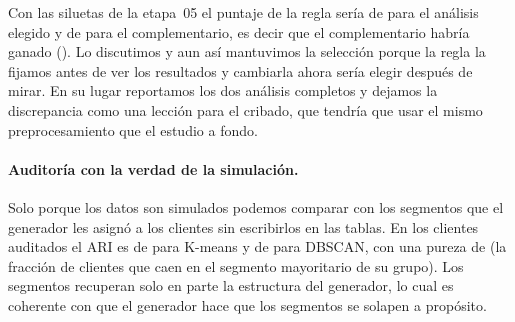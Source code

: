 \begin{table}[!htbp]
\centering
{}
\caption{Silueta y puntaje de la regla con el preprocesamiento del cribado y
con el de la etapa 05, para los dos análisis de agrupamiento: El cambio de
preprocesamiento basta para invertir cuál de los dos gana.}
\label{tab:agr-silueta}
\end{table}

Con las siluetas de la etapa~05 el puntaje de la regla sería de
\AgrPuntajeSelEtapa{} para el análisis elegido y de \AgrPuntajeCompEtapa{}
para el complementario, es decir que el complementario habría ganado
(\AgrComplementarioSupera{}). Lo discutimos y aun así mantuvimos la
selección porque la regla la fijamos antes de ver los resultados y
cambiarla ahora sería elegir después de mirar. En su lugar reportamos los dos
análisis completos y dejamos la discrepancia como una lección para el
cribado, que tendría que usar el mismo preprocesamiento que el estudio a
fondo.

\paragraph{Auditoría con la verdad de la simulación.} Solo porque los datos
son simulados podemos comparar con los \AgrAudSegmentosLatentes{} segmentos
que el generador les asignó a los clientes sin escribirlos en las tablas. En
los \AgrAudClientes{} clientes auditados el ARI es de \AgrAudARIKmeans{} para
K-means y de \AgrAudARIDbscan{} para DBSCAN, con una pureza de
\AgrAudPureza{} (la fracción de clientes que caen en el segmento mayoritario
de su grupo). Los segmentos recuperan solo en parte la estructura del
generador, lo cual es coherente con que el generador hace que los segmentos
se solapen a propósito.
